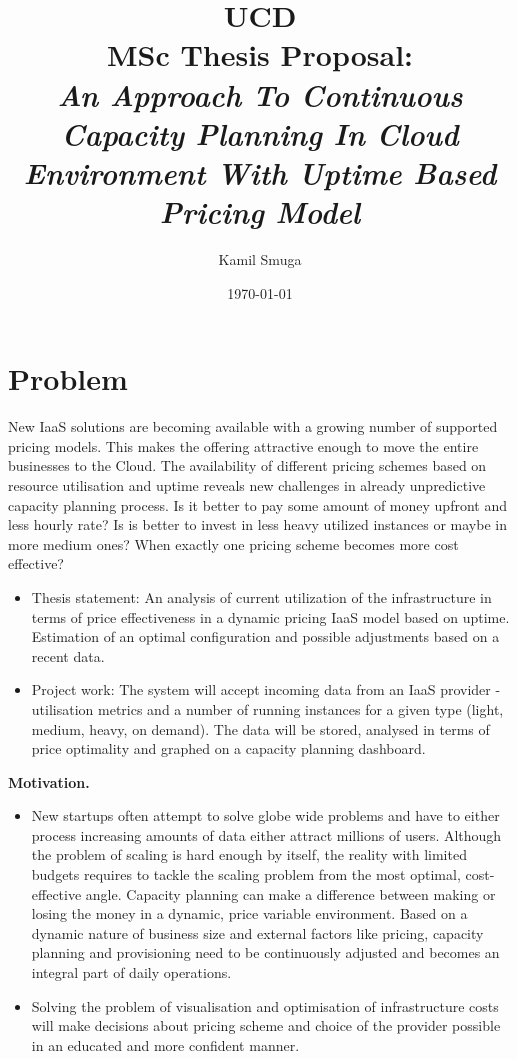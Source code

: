 \documentclass[11pt]{artikel3}
\title{UCD\\MSc Thesis Proposal:\\\emph{An Approach To Continuous Capacity Planning In Cloud Environment With Uptime Based Pricing Model}}
\author{Kamil Smuga}
\date{\today}
\begin{document}
\maketitle


\section{Problem}


New IaaS solutions are becoming available with a growing number of supported pricing models. This makes the offering attractive enough to move the entire businesses to the Cloud. The availability of different pricing schemes based on resource utilisation and uptime reveals new challenges in already unpredictive capacity planning process. Is it better to pay some amount of money upfront and less hourly rate? Is is better to invest in less heavy utilized instances or maybe in more medium ones? When exactly one pricing scheme becomes more cost effective?


\begin{itemize}
  \item Thesis statement: An analysis of current utilization of the infrastructure in terms of price effectiveness in a dynamic pricing IaaS model based on uptime. Estimation of an optimal configuration and possible adjustments based on a recent data.
  \item Project work: The system will accept incoming data from an IaaS provider - utilisation metrics and a number of running instances for a given type (light, medium, heavy, on demand). The data will be stored, analysed in terms of price optimality and graphed on a capacity planning dashboard.  
\end{itemize}


{\bf Motivation.}
\begin{itemize}
  \item New startups often attempt to solve globe wide problems and have to either process increasing amounts of data either attract millions of users. Although the problem of scaling is hard enough by itself, the reality with limited budgets requires to tackle the scaling problem from the most optimal, cost-effective angle. Capacity planning can make a difference between making or losing the money in a dynamic, price variable environment. Based on a dynamic nature of business size and external factors like pricing, capacity planning and provisioning need to be continuously adjusted and becomes an integral part of daily operations.
  \item Solving the problem of visualisation and optimisation of infrastructure costs will make decisions about pricing scheme and choice of the provider possible in an educated and more confident manner.
  
\end{itemize}
\end{document}
